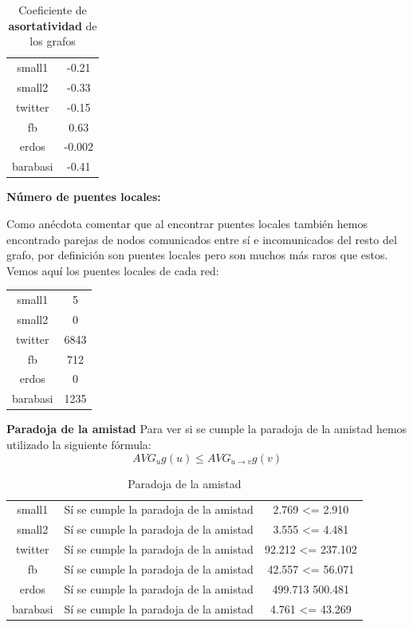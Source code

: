 \documentclass[palatino]{apuntes}
\begin{document}
\begin{table}[h!]
\centering
\caption{Coeficiente de \textbf{asortatividad} de los grafos}
\begin{tabular}{cc}
small1 & -0.21\\
small2 & -0.33\\
twitter & -0.15\\
fb & 0.63\\
erdos & -0.002\\
barabasi & -0.41
\end{tabular}
\end{table}


\newpage

\textbf{Número de puentes locales: }

Como anécdota comentar que al encontrar puentes locales también hemos encontrado parejas de nodos comunicados entre sí e incomunicados del resto del grafo, por definición son puentes locales pero son muchos más raros que estos. Vemos aquí los puentes locales de cada red:

\begin{table}[h!]
\centering
\begin{tabular}{cc}
small1&5\\
small2&0\\
twitter&6843\\
fb&712\\
erdos&0\\
barabasi&1235\\
\end{tabular}
\end{table}

\newpage

\textbf{Paradoja de la amistad}
Para ver si se cumple la paradoja de la amistad hemos utilizado la siguiente fórmula:
$$ AVG_u g(u) \leq AVG_{u\rightarrow v}g(v) $$

\begin{table}[h!]
\centering
\caption{Paradoja de la amistad}
\begin{tabular}{ccc}
small1 & Sí se cumple la paradoja de la amistad & 2.769 <= 2.910\\
small2 & Sí se cumple la paradoja de la amistad & 3.555 <= 4.481\\
twitter & Sí se cumple la paradoja de la amistad & 92.212 <= 237.102\\
fb & Sí se cumple la paradoja de la amistad & 42.557 <= 56.071\\
erdos & Sí se cumple la paradoja de la amistad & 499.713 500.481\\
barabasi & Sí se cumple la paradoja de la amistad & 4.761 <= 43.269\\
\end{tabular}
\end{table}
\end{document}
